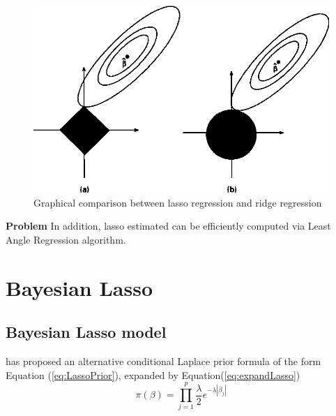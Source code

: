 \begin{figure}
	\includegraphics[width=\linewidth]{lassodemo}
	\caption{Graphical comparison between lasso regression and ridge regression}
	\label{fig:lassodemo}
\end{figure}

\textbf{Problem}
In addition, lasso estimated can be efficiently computed via Least Angle Regression algorithm.


\section{Bayesian Lasso}
\subsection{Bayesian Lasso model}
\cite{park_casella_2008} has proposed an alternative conditional Laplace prior formula of the form Equation (\ref{eq:LassoPrior}), expanded by Equation(\ref{eq:expandLasso})
\begin{equation}
	\label{eq:expandLasso}
	\pi(\beta) = \prod_{j=1}^p \frac{\lambda}{2} e^{-\lambda|\beta_j|}
\end{equation}

